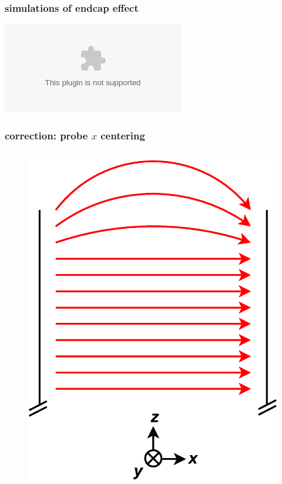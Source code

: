 \documentclass{beamer}
\newcommand{\pyplot}{\includegraphics[width=\textwidth, trim=60px 60px 60px 40px]}
\begin{document}
\begin{frame}
\frametitle{simulations of endcap effect}

    \begin{center}
        \pyplot{figures/Bz_z_sim.eps}
    \end{center}

\end{frame}


\begin{frame}
\frametitle{correction: probe $x$ centering}

    \begin{columns}[b]
    
    \begin{column}{0.5\textwidth}
    \begin{figure}
    \includegraphics[width=\textwidth]
    {figures/field_noendcap.eps}
    \end{figure}
    \vspace{0pt}
    \end{column}


\end{columns}
\end{frame}
\end{document}

